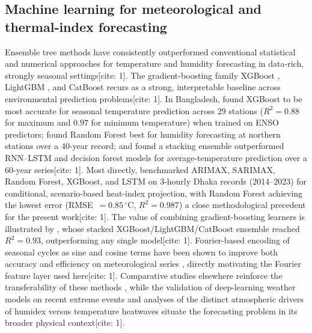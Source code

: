 \documentclass[pdflatex,sn-mathphys-ay]{sn-jnl}
\newcommand{\degC}{\ensuremath{^{\circ}\mathrm{C}}}
\begin{document}
\subsection{Machine learning for meteorological and thermal-index forecasting}
Ensemble tree methods have consistently outperformed conventional statistical and numerical approaches for temperature and humidity forecasting in data-rich, strongly seasonal settings[cite: 1]. The gradient-boosting family XGBoost \citep{chen2016xgboost}, LightGBM \citep{ke2017lightgbm}, and CatBoost \citep{prokhorenkova2018catboost} recurs as a strong, interpretable baseline across environmental prediction problems[cite: 1]. In Bangladesh, \citet{islam2026enso} found XGBoost to be most accurate for seasonal temperature prediction across 29 stations ($R^{2}=0.88$ for maximum and $0.97$ for minimum temperature) when trained on ENSO predictors; \citet{akter2025} found Random Forest best for humidity forecasting at northern stations over a 40-year record; and \citet{rahman2024rnlstm} found a stacking ensemble outperformed RNN--LSTM and decision forest models for average-temperature prediction over a 60-year series[cite: 1]. Most directly, \citet{mollah2026mlheatindex} benchmarked ARIMAX, SARIMAX, Random Forest, XGBoost, and LSTM on 3-hourly Dhaka records (2014--2023) for conditional, scenario-based heat-index projection, with Random Forest achieving the lowest error (RMSE~$=0.85\,\degC$, $R^{2}=0.987$) a close methodological precedent for the present work[cite: 1]. The value of combining gradient-boosting learners is illustrated by \citet{kim2023toxins}, whose stacked XGBoost/LightGBM/CatBoost ensemble reached $R^{2}=0.93$, outperforming any single model[cite: 1]. Fourier-based encoding of seasonal cycles as sine and cosine terms have been shown to improve both accuracy and efficiency on meteorological series \citep{galansales2024}, directly motivating the Fourier feature layer used here[cite: 1]. Comparative studies elsewhere reinforce the transferability of these methods \citep{hanoon2021ml,abdelsattar2025ml}, while the validation of deep-learning weather models on recent extreme events \citep{pasche2025validating} and analyses of the distinct atmospheric drivers of humidex versus temperature heatwaves \citep{jeong2025humidex} situate the forecasting problem in its broader physical context[cite: 1].
\end{document}
